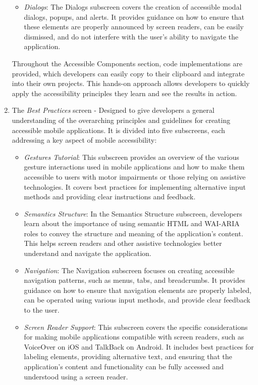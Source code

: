 \begin{enumerate}
\begin{itemize}
        \item \textit{Dialogs}: The Dialogs subscreen covers the creation of accessible modal dialogs, popups, and alerts. It provides guidance on how to ensure that these elements are properly announced by screen readers, can be easily dismissed, and do not interfere with the user's ability to navigate the application.
    \end{itemize}

Throughout the Accessible Components section, code implementations are provided, which developers can easily copy to their clipboard and integrate into their own projects. This hands-on approach allows developers to quickly apply the accessibility principles they learn and see the results in action.

\item The \textit{Best Practices} screen - Designed to give developers a general understanding of the overarching principles and guidelines for creating accessible mobile applications. It is divided into five subscreens, each addressing a key aspect of mobile accessibility:

    \begin{itemize}
        \item \textit{Gestures Tutorial}: This subscreen provides an overview of the various gesture interactions used in mobile applications and how to make them accessible to users with motor impairments or those relying on assistive technologies. It covers best practices for implementing alternative input methods and providing clear instructions and feedback.

        \item \textit{Semantics Structure}: In the Semantics Structure subscreen, developers learn about the importance of using semantic HTML and WAI-ARIA roles to convey the structure and meaning of the application's content. This helps screen readers and other assistive technologies better understand and navigate the application.

        \item \textit{Navigation}: The Navigation subscreen focuses on creating accessible navigation patterns, such as menus, tabs, and breadcrumbs. It provides guidance on how to ensure that navigation elements are properly labeled, can be operated using various input methods, and provide clear feedback to the user.

        \item \textit{Screen Reader Support}: This subscreen covers the specific considerations for making mobile applications compatible with screen readers, such as VoiceOver on iOS and TalkBack on Android. It includes best practices for labeling elements, providing alternative text, and ensuring that the application's content and functionality can be fully accessed and understood using a screen reader.


\end{itemize}
\end{enumerate}
